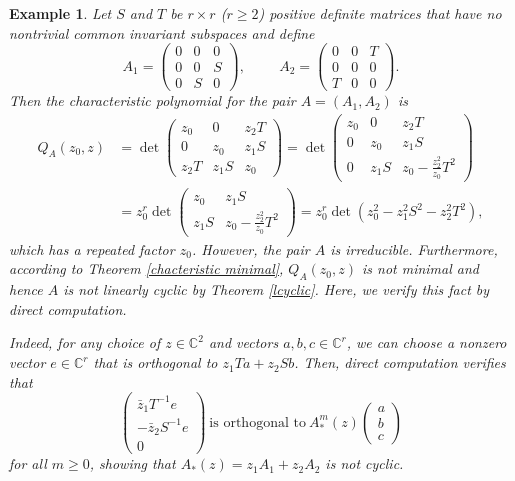 \documentclass[draft, 12pt, reqno]{amsart}
\newcommand{\C}{{\mathbb C}}
\numberwithin{equation}{section}
\theoremstyle{plain}
\newtheorem{example}[theorem]{Example}
\begin{document}
\begin{example}\normalfont
Let $S$ and $T$ be $r\times r$ ($r\geq 2$) positive definite matrices that have no nontrivial common invariant subspaces and define
\[A_1=\begin{pmatrix} 0 & 0 & 0 \\ 0 & 0 & S \\ 0 & S & 0 \end{pmatrix},
\hspace{1cm} A_2=\begin{pmatrix} 0 & 0 & T \\ 0 & 0 & 0 \\ T & 0 & 0 \end{pmatrix}.\]
Then the characteristic polynomial for the pair $A=(A_1, A_2)$ is
\begin{align*}
    Q_A(z_0,z)&=\det \begin{pmatrix} z_0 & 0 & z_2T \\ 0 & z_0 & z_1S \\ z_2T & z_1S & z_0 \end{pmatrix}
    =\det \begin{pmatrix} z_0 & 0 & z_2T \\ 0 & z_0 & z_1S \\ 0 & z_1S & z_0-\frac{z_2^2}{z_0}T^2 \end{pmatrix}\\
    &=z_0^r\det \begin{pmatrix} z_0 & z_1S \\ z_1S & z_0-\frac{z_2^2}{z_0}T^2 \end{pmatrix}=z_0^r\det(z_0^2-z_1^2S^2-z_2^2T^2),
\end{align*}
which has a repeated factor $z_0$. However, the pair $A$ is irreducible. Furthermore, according to Theorem \ref{chacteristic minimal}, $Q_A(z_0,z)$ is not minimal and hence $A$ is not linearly cyclic by Theorem \ref{lcyclic}. Here, we verify this fact by direct computation.

Indeed, for any choice of $z\in \C^2$ and vectors $a, b, c\in \C^r$,
we can choose a nonzero vector $e\in \C^r$ that is orthogonal to $z_1Ta+z_2Sb$. Then, direct computation verifies that 
\[\begin{pmatrix}
\bar{z}_1T^{-1}e \\ -\bar{z}_2S^{-1}e \\ 0 \end{pmatrix} \ \text{is orthogonal to}\ A^m_*(z)
\begin{pmatrix} a \\ b \\ c \end{pmatrix}\] for all $m\geq 0$,
showing that $A_*(z)=z_1A_1+z_2A_2$ is not cyclic.


\end{example}
\end{document}
